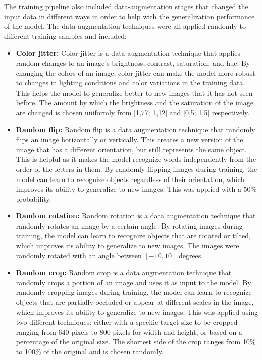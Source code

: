 The training pipeline also included data-augmentation stages that changed the input data in different ways in order to help with the generalization performance of the model. The data augmentation techniques were all applied randomly to different training samples and included:
\begin{itemize}
    \item \textbf{Color jitter:} Color jitter is a data augmentation technique that applies random changes to an image's brightness, contrast, saturation, and hue. By changing the colors of an image, color jitter can make the model more robust to changes in lighting conditions and color variations in the training data. This helps the model to generalize better to new images that it has not seen before. The amount by which the brightness and the saturation of the image are changed is chosen uniformly from  [1,77; 1,12] and [0,5; 1,5] respectively.
    \item \textbf{Random flip:} Random flip is a data augmentation technique that randomly flips an image horizontally or vertically. This creates a new version of the image that has a different orientation, but still represents the same object. This is helpful as it makes the model recognize words independently from the order of the letters in them. By randomly flipping images during training, the model can learn to recognize objects regardless of their orientation, which improves its ability to generalize to new images. This was applied with a 50\% probability.
    \item \textbf{Random rotation:} Random rotation is a data augmentation technique that randomly rotates an image by a certain angle. By rotating images during training, the model can learn to recognize objects that are rotated or tilted, which improves its ability to generalize to new images. The images were randomly rotated with an angle between $[-10, 10]$ degrees.
    \item \textbf{Random crop:} Random crop is a data augmentation technique that randomly crops a portion of an image and uses it as input to the model. By randomly cropping images during training, the model can learn to recognize objects that are partially occluded or appear at different scales in the image, which improves its ability to generalize to new images. This was applied using two different techniques: either with a specific target size to be cropped ranging from 640 pixels to 800 pixels for width and height, or based on a percentage of the original size. The shortest side of the crop ranges from 10\% to 100\% of the original and is chosen randomly.
\end{itemize}


